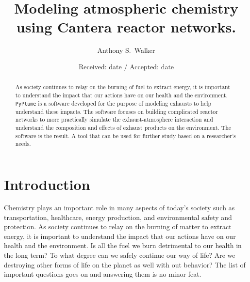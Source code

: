 \documentclass[smallextended,referee]{svjour3}
\begin{document}
\title{Modeling atmospheric chemistry using Cantera reactor networks.}


\author{Anthony S.~Walker}

\date{Received: date / Accepted: date}
\def\pyplume{\texttt{PyPlume}}
\def\SCALE{0.5}

\maketitle 

\begin{abstract}
As society continues to relay on the burning of fuel to extract energy, it is important to understand the impact that our actions have on our health and the environment. \pyplume{} is a software developed for the purpose of modeling exhausts to help understand these impacts. The software focuses on building complicated reactor networks to more practically simulate the exhaust-atmosphere interaction and understand the composition and effects of exhaust products on the environment. The software is the result. A tool that can be used for further study based on a researcher's needs. 
\end{abstract}


\section{Introduction}

Chemistry plays an important role in many aspects of today's society such as transportation, healthcare, energy production, and environmental safety and protection. As society continues to relay on the burning of matter to extract energy, it is important to understand the impact that our actions have on our health and the environment. Is all the fuel we burn detrimental to our health in the long term? To what degree can we safely continue our way of life? Are we destroying other forms of life on the planet as well with out behavior? The list of important questions goes on and answering them is no minor feat.
\end{document}
